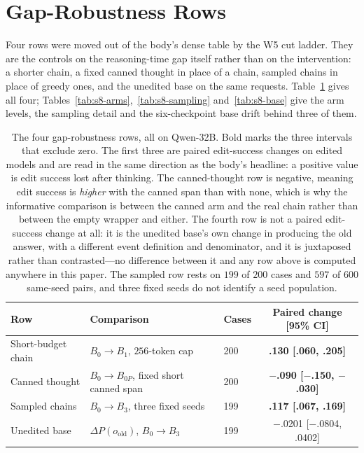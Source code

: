 \documentclass[letterpaper]{article}
\begin{document}
\section{Gap-Robustness Rows}
Four rows were moved out of the body's dense table by the W5 cut ladder.  They
are the controls on the reasoning-time gap itself rather than on the
intervention: a shorter chain, a fixed canned thought in place of a chain,
sampled chains in place of greedy ones, and the unedited base on the same
requests.  Table~\ref{tab:s8-rows} gives all four;
Tables~\ref{tab:s8-arms},~\ref{tab:s8-sampling} and~\ref{tab:s8-base} give the
arm levels, the sampling detail and the six-checkpoint base drift behind three
of them.

\begin{table}[t]
\centering
\small
\begin{tabular}{@{}lllc@{}}
\toprule
Row & Comparison & Cases & Paired change [95\% CI] \\
\midrule
Short-budget chain   & \(B_0 \to B_1\), \(256\)-token cap & 200 & \textbf{.130 [.060, .205]} \\
Canned thought       & \(B_0 \to B_{0P}\), fixed short canned span & 200 & \textbf{$-$.090 [$-$.150, $-$.030]} \\
Sampled chains       & \(B_0 \to B_3\), three fixed seeds & 199 & \textbf{.117 [.067, .169]} \\
Unedited base        & \(\Delta P(o_{\mathrm{old}})\), \(B_0 \to B_3\) & 199 & $-$.0201 [$-$.0804, .0402] \\
\bottomrule
\end{tabular}
\caption{The four gap-robustness rows, all on Qwen-32B.  Bold marks the three
intervals that exclude zero.  The first three are paired edit-success changes on
edited models and are read in the same direction as the body's headline: a
positive value is edit success lost after thinking.  The canned-thought row is
negative, meaning edit success is \emph{higher} with the canned span than with
none, which is why the informative comparison is between the canned arm and the
real chain rather than between the empty wrapper and either.  The fourth row is
not a paired edit-success change at all: it is the unedited base's own change in
producing the old answer, with a different event definition and denominator, and
it is juxtaposed rather than contrasted---no difference between it and any row
above is computed anywhere in this paper.  The sampled row rests on \(199\) of
\(200\) cases and \(597\) of \(600\) same-seed pairs, and three fixed seeds do
not identify a seed population.}
\label{tab:s8-rows}
\end{table}
\end{document}
